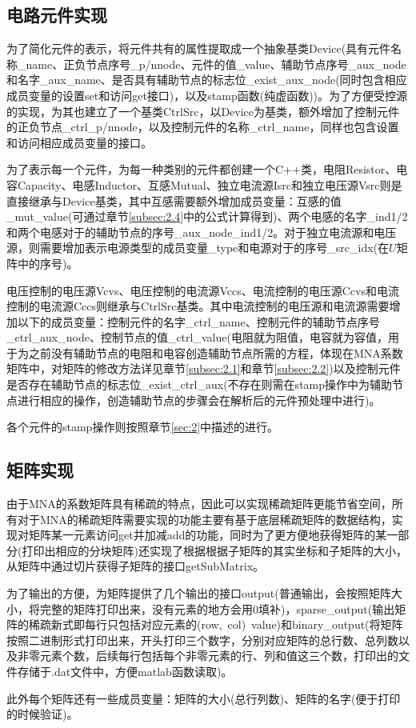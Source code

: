 \documentclass[12pt]{article}
\begin{document}
\subsection{电路元件实现}

\qquad 为了简化元件的表示，将元件共有的属性提取成一个抽象基类Device(具有元件名称\_name、正负节点序号\_p/nnode、元件的值\_value、辅助节点序号\_aux\_node和名字\_aux\_name、是否具有辅助节点的标志位\_exist\_aux\_node(同时包含相应成员变量的设置set和访问get接口)，以及stamp函数(纯虚函数))。为了方便受控源的实现，为其也建立了一个基类CtrlSrc，以Device为基类，额外增加了控制元件的正负节点\_ctrl\_p/nnode，以及控制元件的名称\_ctrl\_name，同样也包含设置和访问相应成员变量的接口。\par
\qquad 为了表示每一个元件，为每一种类别的元件都创建一个C++类，电阻Resistor、电容Capacity、电感Inductor、互感Mutual、独立电流源Isrc和独立电压源Vsrc则是直接继承与Device基类，其中互感需要额外增加成员变量：互感的值\_mut\_value(可通过章节\ref{subsec:2.4}中的公式计算得到)、两个电感的名字\_ind1/2和两个电感对于的辅助节点的序号\_aux\_node\_ind1/2。对于独立电流源和电压源，则需要增加表示电源类型的成员变量\_type和电源对于的序号\_src\_idx(在$U$矩阵中的序号)。\par
\qquad 电压控制的电压源Vcvs、电压控制的电流源Vccs、电流控制的电压源Ccvs和电流控制的电流源Cccs则继承与CtrlSrc基类。其中电流控制的电压源和电流源需要增加以下的成员变量：控制元件的名字\_ctrl\_name、控制元件的辅助节点序号\_ctrl\_aux\_node、控制节点的值\_ctrl\_value(电阻就为阻值，电容就为容值，用于为之前没有辅助节点的电阻和电容创造辅助节点所需的方程，体现在MNA系数矩阵中，对矩阵的修改方法详见章节\ref{subsec:2.1}和章节\ref{subsec:2.2})以及控制元件是否存在辅助节点的标志位\_exist\_ctrl\_aux(不存在则需在stamp操作中为辅助节点进行相应的操作，创造辅助节点的步骤会在解析后的元件预处理中进行)。\par
\qquad 各个元件的stamp操作则按照章节\ref{sec:2}中描述的进行。\par

\subsection{矩阵实现}
\qquad 由于MNA的系数矩阵具有稀疏的特点，因此可以实现稀疏矩阵更能节省空间，所有对于MNA的稀疏矩阵需要实现的功能主要有基于底层稀疏矩阵的数据结构，实现对矩阵某一元素访问get并加减add的功能，同时为了更方便地获得矩阵的某一部分(打印出相应的分块矩阵)还实现了根据根据子矩阵的其实坐标和子矩阵的大小，从矩阵中通过切片获得子矩阵的接口getSubMatrix。\par 
\qquad 为了输出的方便，为矩阵提供了几个输出的接口output(普通输出，会按照矩阵大小，将完整的矩阵打印出来，没有元素的地方会用0填补)，sparse\_output(输出矩阵的稀疏新式即每行只包括对应元素的(row,\ col)\ value)和binary\_output(将矩阵按照二进制形式打印出来，开头打印三个数字，分别对应矩阵的总行数、总列数以及非零元素个数，后续每行包括每个非零元素的行、列和值这三个数，打印出的文件存储于.dat文件中，方便matlab函数读取)。\par
\qquad 此外每个矩阵还有一些成员变量：矩阵的大小(总行列数)、矩阵的名字(便于打印的时候验证)。\par
\end{document}
